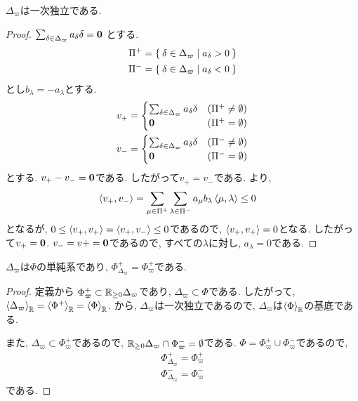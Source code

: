 \begin{lemma}
  \label{lem:simple:linidep}
$\Delta_{\varpi}$は一次独立である.
\end{lemma}
\begin{proof}
  $\sum_{\delta\in\Delta_{\varpi}}a_\delta \delta = \boldsymbol{0}$
  とする.
  \begin{align*}
    \Pi^+&=\Set{\delta\in\Delta_{\varpi}|a_\delta >0}\\
    \Pi^-&=\Set{\delta\in\Delta_{\varpi}|a_\delta <0}
  \end{align*}
  とし$b_\lambda=-a_\lambda$とする.
  \begin{align*}
    v_+&=
    \begin{cases}
      \sum_{\delta\in\Delta_{\varpi}}a_\delta\delta&(\Pi^+\neq \emptyset)\\
      \boldsymbol{0}&(\Pi^+= \emptyset)
    \end{cases}\\
    v_-&=
    \begin{cases}
      \sum_{\delta\in\Delta_{\varpi}}a_\delta\delta&(\Pi^-\neq \emptyset)\\
      \boldsymbol{0}&(\Pi^-= \emptyset)
    \end{cases}
  \end{align*}
  とする. $v_+-v_-=\boldsymbol{0}$である.
  したがって$v_+=v_-$である.
より,
  \begin{align*}
    \Braket{v_+,v_-}&
    =\sum_{\mu\in\Pi^+}\sum_{\lambda\in\Pi^-}a_\mu b_\lambda \Braket{\mu,\lambda}
    \leq 0 
  \end{align*}
  となるが, $0\leq \Braket{v_+,v_+}=\Braket{v_+,v_-}\leq 0$であるので,
  $\Braket{v_+,v_+}=0$となる.  したがって$v_+=\boldsymbol{0}$.
  $v_-=v+=\boldsymbol{0}$であるので,
  すべての$\lambda$に対し,
  $a_\lambda=0$である.
\end{proof}



\begin{prop}
  $\Delta_{\varpi}$は$\Phi$の単純系であり,
  $\Phi^+_{\Delta_{\varpi}}=\Phi_{\varpi}^+$である.
\end{prop}
\begin{proof}
  定義から
  $\Phi_{\varpi}^+\subset \mathbb{R}_{\geq 0}\Delta_{\varpi}$であり,
  $\Delta_{\varpi}\subset\Phi$である.
  したがって, $\Braket{\Delta_{\varpi}}_{\mathbb{R}}=\Braket{\Phi^+}_{\mathbb{R}}=\Braket{\Phi}_{\mathbb{R}}$.
  から, $\Delta_{\varpi}$は一次独立であるので,
  $\Delta_{\varpi}$は$\Braket{\Phi}_{\mathbb{R}}$の基底である.

  また, $\Delta_{\varpi}\subset \Phi_{\varpi}^+$であるので,
  $\mathbb{R}_{\geq 0}\Delta_{\varpi}\cap \Phi_{\varpi}^-=\emptyset$である.
  $\Phi=\Phi_{\varpi}^+\cup \Phi_{\varpi}^-$であるので,
  \begin{align*}
    \Phi_{\Delta_{\varpi}}^+=\Phi_{\varpi}^+\\
    \Phi_{\Delta_{\varpi}}^-=\Phi_{\varpi}^-
  \end{align*}
  である.
\end{proof}


